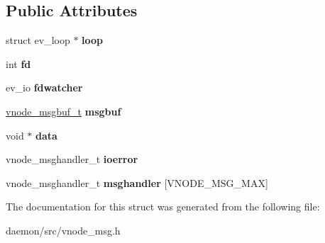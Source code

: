 \subsection*{Public Attributes}
\begin{DoxyCompactItemize}
\item 
\hypertarget{structvnode__msgio_a6d768e9d6201833860552d4dc95b834d}{struct ev\+\_\+loop $\ast$ {\bfseries loop}}\label{structvnode__msgio_a6d768e9d6201833860552d4dc95b834d}

\item 
\hypertarget{structvnode__msgio_af829e41622a1d836edebfb3fcf6a9322}{int {\bfseries fd}}\label{structvnode__msgio_af829e41622a1d836edebfb3fcf6a9322}

\item 
\hypertarget{structvnode__msgio_a9acbba2cd94f611ae27db84bb90f2fcb}{ev\+\_\+io {\bfseries fdwatcher}}\label{structvnode__msgio_a9acbba2cd94f611ae27db84bb90f2fcb}

\item 
\hypertarget{structvnode__msgio_a1063d9c3498f39279595a7b9fd3b6014}{\hyperlink{structvnode__msgbuf__t}{vnode\+\_\+msgbuf\+\_\+t} {\bfseries msgbuf}}\label{structvnode__msgio_a1063d9c3498f39279595a7b9fd3b6014}

\item 
\hypertarget{structvnode__msgio_af494b2e3d08fb833c69a3de589aefe44}{void $\ast$ {\bfseries data}}\label{structvnode__msgio_af494b2e3d08fb833c69a3de589aefe44}

\item 
\hypertarget{structvnode__msgio_a845c3c32b79e5be89067b9266e87a793}{vnode\+\_\+msghandler\+\_\+t {\bfseries ioerror}}\label{structvnode__msgio_a845c3c32b79e5be89067b9266e87a793}

\item 
\hypertarget{structvnode__msgio_a83e2e3aa7b24c07580fe6dd31bf1f78b}{vnode\+\_\+msghandler\+\_\+t {\bfseries msghandler} \mbox{[}V\+N\+O\+D\+E\+\_\+\+M\+S\+G\+\_\+\+M\+A\+X\mbox{]}}\label{structvnode__msgio_a83e2e3aa7b24c07580fe6dd31bf1f78b}

\end{DoxyCompactItemize}


The documentation for this struct was generated from the following file\+:\begin{DoxyCompactItemize}
\item 
daemon/src/vnode\+\_\+msg.\+h\end{DoxyCompactItemize}
